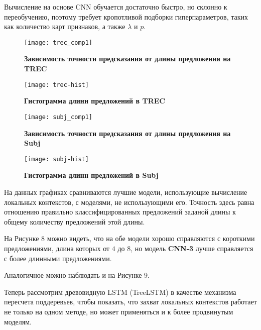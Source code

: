 Вычисление на основе CNN обучается достаточно быстро, но склонно к переобучению, поэтому требует кропотливой подборки гиперпараметров, таких как количество карт признаков, а также $\lambda$ и $p$.

\begin{figure}[H]
\texttt{[image: trec\_comp1]}
\caption{\textbf{Зависимость точности предсказания от длины предложения на TREC}}
\label{fig:context_ex}
\end{figure}

\begin{figure}[H]
\texttt{[image: trec-hist]}
\caption{\textbf{Гистограмма длинн предложений в TREC}}
\end{figure}

\begin{figure}[H]
\texttt{[image: subj\_comp1]}
\caption{\textbf{Зависимость точности предсказания от длины предложения на Subj}}
\label{fig:context_ex}
\end{figure}

\begin{figure}[H]
\texttt{[image: subj-hist]}
\caption{\textbf{Гистограмма длинн предложений в Subj}}
\end{figure}

\vspace{20mm}

На данных графиках сравниваются лучшие модели, использующие вычисление локальных контекстов, с моделями, не использующими его. Точность здесь равна отношению правильно классифицированных предложений заданой длины к общему количеству предложений этой длины. 

На Рисунке 8 можно видеть, что на обе модели хорошо справляются с короткими предложениями, длина которых от $4$ до $8$, но модель \textbf{CNN-3} лучше справляется с более длинными предложениями.

Аналогичное можно наблюдать и на Рисунке 9.

Теперь рассмотрим  древовидную LSTM (TreeLSTM) в качестве механизма пересчета поддеревьев, 
чтобы показать, что захват локальных контекстов работает не только на одном методе, 
но может применяться и к более продвинутым моделям.

